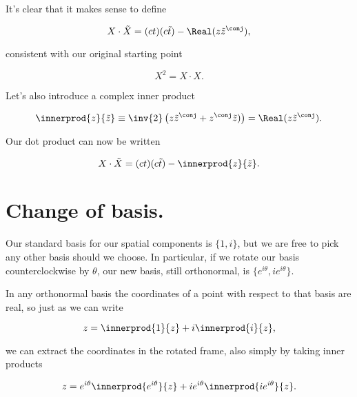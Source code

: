 It's clear that it makes sense to define

\begin{equation}\label{eqn:complexPlanarBoost:n}
X \cdot \tilde{X} = (ct) (c \tilde{t}) - \Real (z \tilde{z}^\conj),
\end{equation}

consistent with our original starting point

\begin{equation}\label{eqn:complexPlanarBoost:n}
X^2 = X \cdot X.
\end{equation}

Let's also introduce a complex inner product

\begin{equation}\label{eqn:complexPlanarBoost:n}
\innerprod{z}{\tilde{z}} \equiv \inv{2} \left( z \tilde{z}^\conj + z^\conj \tilde{z}) \right) = \Real (z \tilde{z}^\conj).
\end{equation}

Our dot product can now be written

\begin{equation}\label{eqn:complexPlanarBoost:n}
X \cdot \tilde{X} = (ct) (c \tilde{t}) - \innerprod{z}{\tilde{z}}.
\end{equation}

\section{Change of basis.}

Our standard basis for our spatial components is $\{1, i\}$, but we are free to pick any other basis should we choose.  In particular, if we rotate our basis counterclockwise by $\theta$, our new basis, still orthonormal, is $\{ e^{i\theta}, i e^{i\theta} \}$.

In any orthonormal basis the coordinates of a point with respect to that basis are real, so just as we can write

\begin{equation}\label{eqn:complexPlanarBoost:n}
z = \innerprod{1}{z} + i \innerprod{i}{z},
\end{equation}

we can extract the coordinates in the rotated frame, also simply by taking inner products

\begin{equation}\label{eqn:complexPlanarBoost:n}
z = e^{i \theta} \innerprod{e^{i \theta}}{z} + i e^{i\theta} \innerprod{i e^{i\theta} }{z}.
\end{equation}


